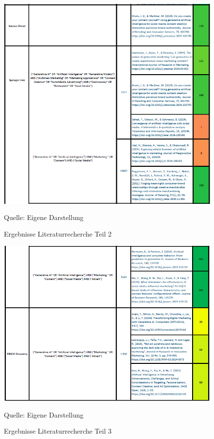 \begin{figure}[htbp]
    \centering
    \includegraphics[width=\textwidth]{abbildungen/Literaturtabelle_2}
    \caption{Ergebnisse Literaturrecherche Teil 2}
    \label{fig:Literaturtabelle_2}
    \raggedright Quelle: Eigene Darstellung
\end{figure}

\begin{figure}[htbp]
    \centering
    \includegraphics[width=\textwidth]{abbildungen/Literaturtabelle_3}
    \caption{Ergebnisse Literaturrecherche Teil 3}
    \label{fig:Literaturtabelle_3}
    \raggedright Quelle: Eigene Darstellung
\end{figure}

